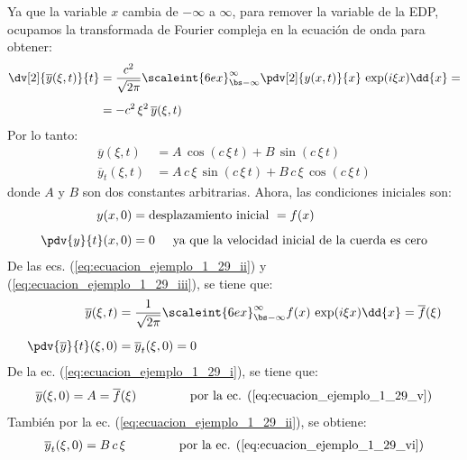 Ya que la variable $x$ cambia de $-\infty$ a $\infty$, para remover la variable de la EDP, ocupamos la transformada de Fourier compleja en la ecuación de onda para obtener:
\begin{align*}
\dv[2]{\overline{y}(\xi, t)}{t} &= \dfrac{c^{2}}{\sqrt{2 \pi}} \scaleint{6ex}_{\bs -\infty}^{\infty} \pdv[2]{y(x, t)}{x} \, \exp(i \xi x) \dd{x} = \\[0.5em]
&= - c^{2} \, \xi^{2} \, \overline{y} (\xi, t)
\end{align*}
Por lo tanto:
\begin{align}
\overline{y} (\xi, t) &= A \, \cos (c \, \xi \, t) + B \, \sin (c \, \xi \, t) \label{eq:ecuacion_ejemplo_1_29_i} \\[0.5em]
\overline{y}_{t} (\xi, t) &= A \, c \, \xi \, \sin (c \, \xi \, t) + B \, c \, \xi \, \cos (c \, \xi \, t) \label{eq:ecuacion_ejemplo_1_29_ii}
\end{align}
donde $A$ y $B$ son dos constantes arbitrarias. Ahora, las condiciones iniciales son:
\begin{align}
y(x, 0) &= \mbox{desplazamiento inicial } = f (x) \label{eq:ecuacion_ejemplo_1_29_iii} \\[0.5em]
\pdv{y}{t} (x, 0) &= 0 \hspace{0.5cm} \mbox{ya que la velocidad inicial de la cuerda es cero} \label{eq:ecuacion_ejemplo_1_29_iv}
\end{align}
De las ecs. (\ref{eq:ecuacion_ejemplo_1_29_ii}) y (\ref{eq:ecuacion_ejemplo_1_29_iii}), se tiene que:
\begin{align}
\overline{y} (\xi, t) &= \dfrac{1}{\sqrt{2 \pi}} \scaleint{6ex}_{\bs -\infty}^{\infty} f (x) \, \exp(i \xi x) \dd{x} = \overline{f} (\xi) \label{eq:ecuacion_ejemplo_1_29_v} \\[0.5em]
\pdv{\overline{y}}{t} (\xi, 0) &= \overline{y}_{t} (\xi, 0) = 0 \label{eq:ecuacion_ejemplo_1_29_vi}
\end{align}
De la ec. (\ref{eq:ecuacion_ejemplo_1_29_i}), se tiene que:
\begin{align}
\overline{y} (\xi, 0) = A = \overline{f} (\xi) \hspace{1.5cm} \mbox{por la ec. (\ref{eq:ecuacion_ejemplo_1_29_v})}
\end{align}
También por la ec. (\ref{eq:ecuacion_ejemplo_1_29_ii}), se obtiene:
\begin{align}
\overline{y}_{t} (\xi, 0) = B \, c \, \xi \hspace{1.5cm} \mbox{por la ec. (\ref{eq:ecuacion_ejemplo_1_29_vi})}
\end{align}
